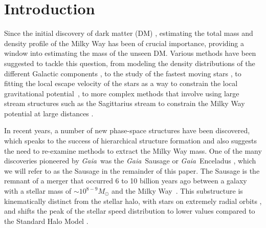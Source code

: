 \documentclass[twocolumn,preprintnumbers]{aastex63}
\newcommand{\Gaia}{\textit{Gaia}~}
\begin{document}
\section{Introduction} 
\label{sec:intro}



Since the initial discovery of dark matter (DM) \citep{1933AcHPh...6..110Z}, estimating the total mass and density profile of the Milky Way has been of crucial importance, providing a window into estimating the mass of the unseen DM. Various methods have been suggested to tackle this question, from modeling the density distributions of the different Galactic components \citep{1981ApJ...251...61C}, to the study of the fastest moving stars \citep{1982MNRAS.201..579A},  to fitting the local escape velocity of the stars as a way to constrain the local gravitational potential~\citep{1990ApJ}, to more complex methods that involve using large stream structures such as the Sagittarius stream to constrain the Milky Way potential at large distances \citep{2014MNRAS.445.3788G,2017ApJ...847...42D}. 

In recent years, a number of new phase-space structures have been discovered, which speaks to the success of hierarchical structure formation \citep{White:1977jf} and also suggests the need to re-examine methods to extract the Milky Way mass.
One of the many discoveries pioneered by \Gaia was the \Gaia Sausage or \Gaia Enceladus \citep{2018MNRAS.478..611B,2018Natur.563...85H}, which we will refer to as the Sausage in the remainder of this paper. The Sausage is the remnant of a merger that occurred 6 to 10 billion years ago between a galaxy with a stellar mass of $\sim 10^{8-9} M_{\odot}$ and the Milky Way~\citep{2018ApJ...863L..28M,2018ApJ...862L...1D,2018arXiv180704290L}.  This substructure is kinematically distinct from the stellar halo, with stars on extremely radial orbits \citep{2018ApJ...862L...1D}, and shifts the peak of the stellar speed distribution to lower values compared to the Standard Halo Model \citep{2019ApJ...874....3N}. 
\end{document}
